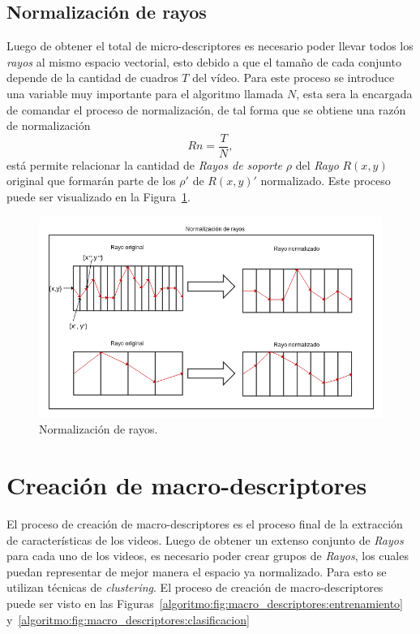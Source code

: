 	
		
		
	\subsection{Normalización de rayos}
	\label{algoritmo:normalizacion}
	Luego de obtener el total de micro-descriptores es necesario poder llevar todos los \textit{rayos} al mismo espacio vectorial, esto debido a que el tamaño de cada conjunto depende de la cantidad de cuadros $T$ del vídeo. Para este proceso se introduce una variable muy importante para el algoritmo llamada $N$, esta sera la encargada de comandar el proceso de normalización, de tal forma que se obtiene una razón de normalización
	\begin{equation}
		Rn = \frac{T}{N},
	\end{equation}
	está permite relacionar la cantidad de \textit{Rayos de soporte} $\rho$ del \textit{Rayo} $R(x,y)$ original que formarán parte de los $\rho'$ de $R(x,y)'$ normalizado. Este proceso puede ser visualizado en la Figura~\ref{algoritmo:fig:normalizacion}.
	
	\begin{figure}[bt]
		\centering
    		\includegraphics[width=1\textwidth]{Figuras/Diagramas/normalizacion_de_rayos.png}
  		\caption{Normalización de rayos.}
  		\label{algoritmo:fig:normalizacion}
	\end{figure}	

	
\newpage	
\section{Creación de macro-descriptores}
\label{sec:macro-descriptores}
El proceso de creación de macro-descriptores es el proceso final de la extracción de características de los videos. Luego de obtener un extenso conjunto de \textit{Rayos} para cada uno de los videos, es necesario poder crear grupos de \textit{Rayos}, los cuales puedan representar de mejor manera el espacio ya normalizado. Para esto se utilizan técnicas de \textit{clustering}. El proceso de creación de macro-descriptores puede ser visto en las Figuras~\ref{algoritmo:fig:macro_descriptores:entrenamiento} y~\ref{algoritmo:fig:macro_descriptores:clasificacion}

